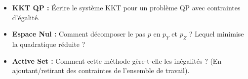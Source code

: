 \bigskip
\begin{checkpoint}
\begin{itemize}
    \item \textbf{KKT QP :} Écrire le système KKT pour un problème QP avec contraintes d'égalité.
    \item \textbf{Espace Nul :} Comment décomposer le pas $p$ en $p_Y$ et $p_Z$ ? Lequel minimise la quadratique réduite ?
    \item \textbf{Active Set :} Comment cette méthode gère-t-elle les inégalités ? (En ajoutant/retirant des contraintes de l'ensemble de travail).
\end{itemize}
\end{checkpoint}

